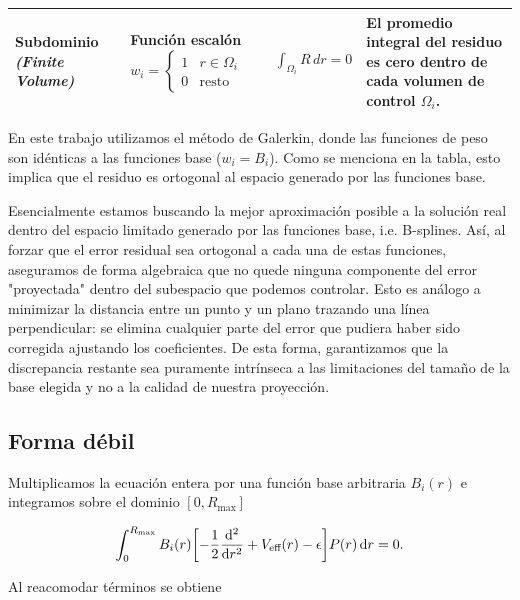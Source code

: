 \documentclass[12pt, a4paper, oneside, spanish]{book}
\begin{document}
\begin{table}[htbp]
\begin{tabularx}{\textwidth}{ 
        >{\RaggedRight\bfseries}m{2.5cm}  
        >{\RaggedRight}m{3.5cm}           
        >{\centering}m{3.5cm}             
        >{\RaggedRight\arraybackslash}X   
    }
        Subdominio \newline \textit{\footnotesize (Finite \newline Volume)} & 
        Función escalón \newline $w_i = \begin{cases} 1 & r \in \Omega_i \\ 0 & \text{resto} \end{cases}$ & 
        $\displaystyle \int_{\Omega_i} R \, dr = 0$ & 
        El \textbf{promedio integral} del residuo es cero dentro de cada volumen de control $\Omega_i$. \\
        \bottomrule
    \end{tabularx}
\end{table}

En este trabajo utilizamos el método de Galerkin, donde las funciones de peso son idénticas a las funciones base (\( w_i = B_i \)). Como se menciona en la tabla, esto implica que el residuo es ortogonal al espacio generado por las funciones base.

Esencialmente estamos buscando la mejor aproximación posible a la solución real dentro del espacio limitado generado por las funciones base, i.e. B-splines. Así, al forzar que el error residual sea ortogonal a cada una de estas funciones, aseguramos de forma algebraica que no quede ninguna componente del error "proyectada" dentro del subespacio que podemos controlar. Esto es análogo a minimizar la distancia entre un punto y un plano trazando una línea perpendicular: se elimina cualquier parte del error que pudiera haber sido corregida ajustando los coeficientes. De esta forma, garantizamos que la discrepancia restante sea puramente intrínseca a las limitaciones del tamaño de la base elegida y no a la calidad de nuestra proyección.

\subsection{Forma débil}

Multiplicamos la ecuación entera por una función base arbitraria \( B_i(r) \) e integramos sobre el dominio \( [0,R_{\text{max}}] \)

\begin{equation}
\label{eq:mwr1}
  \int_{0}^{R_{\text{max}}} B_i(r) \qty[ -\frac{1}{2}\dv[2]{r} + V_{\text{eff}}(r) - \epsilon ] P(r) \dd{r} = 0.
\end{equation}

Al reacomodar términos se obtiene
\end{document}
